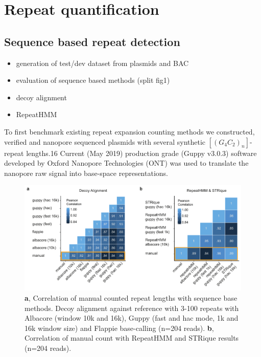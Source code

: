 \section{Repeat quantification}
\label{sec:strique:quantification}

\subsection{Sequence based repeat detection}
\label{subsec:strique:seq_repeat_counts}

\begin{itemize}
	\item generation of test/dev dataset from plasmids and BAC
	\item evaluation of sequence based methods (split fig1)
	\item decoy alignment
	\item RepeatHMM
\end{itemize}

To first benchmark existing repeat expansion counting methods we constructed, verified and nanopore sequenced plasmids with several synthetic $ [(G_{4}C_{2})_{n}] $-repeat lengths.16 Current (May 2019) production grade (Guppy v3.0.3) software developed by Oxford Nanopore Technologies (ONT) was used to translate the nanopore raw signal into base-space representations.

\begin{figure}[h]
	\centering
	\includegraphics[width=1.0\textwidth]{figures/strique/count_sequence_corr.pdf}
	\captionsetup{format=plain}
	\caption[Correlation of sequence based STR detection methods]{\textbf{a}, Correlation of manual counted repeat lengths with sequence base methods. Decoy alignment against reference with 3-100 repeats with Albacore (window 10k and 16k), Guppy (fast and hac mode, 1k and 16k window size) and Flappie base-calling (n=204 reads). \textbf{b}, Correlation of manual count with RepeatHMM and STRique results (n=204 reads).}
	\label{fig:strique:count_sequence_corr}
\end{figure}

